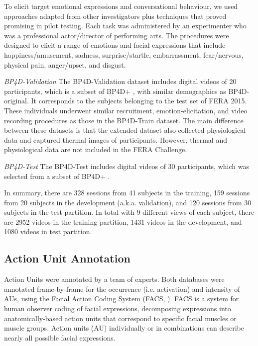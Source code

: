 \documentclass[a4paper, 10pt, conference]{ieeeconf}      \usepackage{FG2017}
\begin{document}
To elicit target emotional expressions and conversational behaviour, we used approaches adapted from other investigators plus techniques that proved promising in pilot testing. Each task was administered by an experimenter who was a professional actor/director of performing arts. The procedures were designed to elicit a range of emotions and facial expressions that include happiness/amusement, sadness, surprise/startle, embarrassment, fear/nervous, physical pain, anger/upset, and disgust.

\emph{BP4D-Validation}
The BP4D-Validation dataset includes digital videos of 20 participants, which is a subset of BP4D+ \cite{ZhangEtAl2016_MSE}, with similar demographics as BP4D-original. It corresponds to the subjects belonging to the test set of FERA 2015. These individuals underwent similar recruitment, emotion-elicitation, and video recording procedures as those in the BP4D-Train dataset. The main difference between these datasets is that the extended dataset also collected physiological data and captured thermal images of participants. However, thermal and physiological data are not included in the FERA Challenge.

\emph{BP4D-Test}
The BP4D-Test includes digital videos of 30 participants, which was selected from a subset of BP4D+ \cite{ZhangEtAl2016_MSE}. 

In summary, there are 328 sessions from 41 subjects in the training, 159 sessions from 20 subjects in the development (a.k.a. validation), and 120 sessions from 30 subjects in the test partition. 
In total with 9 different views of each subject, there are 2952 videos in the training partition, 1431 videos in the development, and 1080 videos in test partition.





\subsection{Action Unit Annotation}
\noindent Action Units were annotated by a team of experts. Both databases were annotated frame-by-frame for the occurrence (i.e. activation) and intensity of AUs, using the Facial Action Coding System (FACS, \cite{FACS2}). FACS is a system for human observer coding of facial expressions, decomposing expressions into anatomically-based action units that correspond to specific facial muscles or muscle groups. Action units (AU) individually or in combinations can describe nearly all possible facial expressions. 
\end{document}
